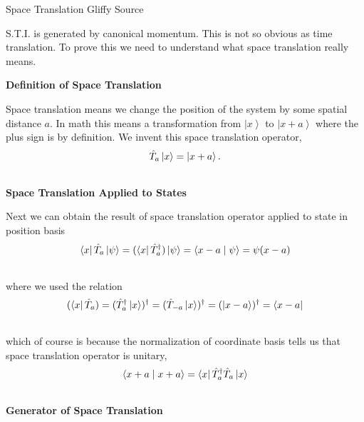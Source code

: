 \documentclass[letterpaper,10pt,english]{sphinxmanual}
\newcommand{\bra}[1]{\left\langle #1\right|}
\newcommand{\ket}[1]{\left| #1\right\rangle}
\newcommand{\braket}[2]{\langle #1 \mid #2 \rangle}
\begin{document}
Space Translation Gliffy Source

S.T.I. is generated by canonical momentum. This is not so obvious as time translation. To prove this we need to understand what space translation really means.

\textbf{Definition of Space Translation}

Space translation means we change the position of the system by some spatial distance $a$. In math this means a transformation from $\ket{x}$ to $\ket{x+a}$ where the plus sign is by definition. We invent this space translation operator,
\begin{gather}
\begin{split}\hat T_a  \ket{x} = \ket{x + a} .\end{split}\notag\\\begin{split}\end{split}\notag
\end{gather}
\textbf{Space Translation Applied to States}

Next we can obtain the result of space translation operator applied to state in position basis
\begin{gather}
\begin{split}\bra{x}\hat T_a \ket{\psi} = (\bra{x}\hat T_a^\dagger) \ket{\psi} = \braket{x-a}{\psi} = \psi(x-a)\end{split}\notag\\\begin{split}\end{split}\notag
\end{gather}
where we used the relation
\begin{gather}
\begin{split}(\bra{x} \hat T_a) =  (\hat T_a^\dagger \ket{x} )^\dagger = (\hat T _ {-a} \ket{x}  )^\dagger = (\ket{x-a})^\dagger = \bra{x-a}\end{split}\notag\\\begin{split}\end{split}\notag
\end{gather}
which of course is because the normalization of coordinate basis tells us that space translation operator is unitary,
\begin{gather}
\begin{split}\braket{x+a}{x+a} = \bra{x}\hat T_a^\dagger \hat T_a \ket{x}\end{split}\notag\\\begin{split}\end{split}\notag
\end{gather}
\textbf{Generator of Space Translation}
\end{document}
